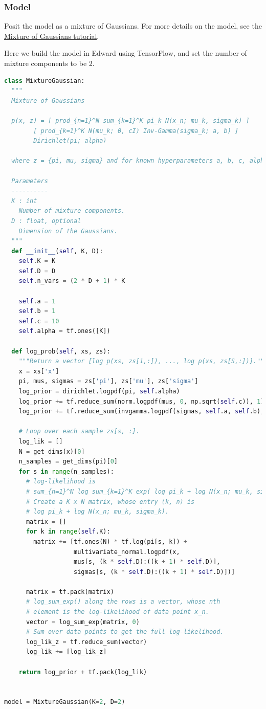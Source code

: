 \subsubsection{Model}

Posit the model as a mixture of Gaussians. For more details on the
model, see the
\href{tut_mixture_gaussian}
{Mixture of Gaussians tutorial}.

Here we build the model in Edward using TensorFlow, and set the number
of mixture components to be 2.
\begin{lstlisting}[language=Python]
class MixtureGaussian:
  """
  Mixture of Gaussians

  p(x, z) = [ prod_{n=1}^N sum_{k=1}^K pi_k N(x_n; mu_k, sigma_k) ]
        [ prod_{k=1}^K N(mu_k; 0, cI) Inv-Gamma(sigma_k; a, b) ]
        Dirichlet(pi; alpha)

  where z = {pi, mu, sigma} and for known hyperparameters a, b, c, alpha.

  Parameters
  ----------
  K : int
    Number of mixture components.
  D : float, optional
    Dimension of the Gaussians.
  """
  def __init__(self, K, D):
    self.K = K
    self.D = D
    self.n_vars = (2 * D + 1) * K

    self.a = 1
    self.b = 1
    self.c = 10
    self.alpha = tf.ones([K])

  def log_prob(self, xs, zs):
    """Return a vector [log p(xs, zs[1,:]), ..., log p(xs, zs[S,:])]."""
    x = xs['x']
    pi, mus, sigmas = zs['pi'], zs['mu'], zs['sigma']
    log_prior = dirichlet.logpdf(pi, self.alpha)
    log_prior += tf.reduce_sum(norm.logpdf(mus, 0, np.sqrt(self.c)), 1)
    log_prior += tf.reduce_sum(invgamma.logpdf(sigmas, self.a, self.b), 1)

    # Loop over each sample zs[s, :].
    log_lik = []
    N = get_dims(x)[0]
    n_samples = get_dims(pi)[0]
    for s in range(n_samples):
      # log-likelihood is
      # sum_{n=1}^N log sum_{k=1}^K exp( log pi_k + log N(x_n; mu_k, sigma_k) )
      # Create a K x N matrix, whose entry (k, n) is
      # log pi_k + log N(x_n; mu_k, sigma_k).
      matrix = []
      for k in range(self.K):
        matrix += [tf.ones(N) * tf.log(pi[s, k]) +
                   multivariate_normal.logpdf(x,
                   mus[s, (k * self.D):((k + 1) * self.D)],
                   sigmas[s, (k * self.D):((k + 1) * self.D)])]

      matrix = tf.pack(matrix)
      # log_sum_exp() along the rows is a vector, whose nth
      # element is the log-likelihood of data point x_n.
      vector = log_sum_exp(matrix, 0)
      # Sum over data points to get the full log-likelihood.
      log_lik_z = tf.reduce_sum(vector)
      log_lik += [log_lik_z]

    return log_prior + tf.pack(log_lik)


model = MixtureGaussian(K=2, D=2)
\end{lstlisting}


